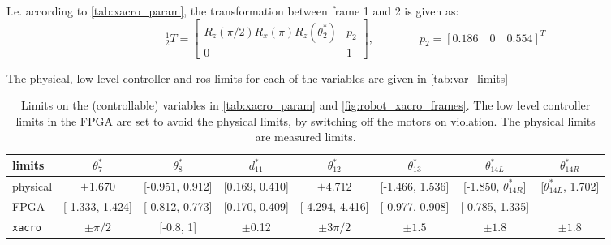I.e. according to \autoref{tab:xacro_param}, the transformation between frame 1 and 2 is given as:
\begin{equation}
^1_2T = 
\begin{bmatrix}
R_z(\pi/2)R_x(\pi)R_z(\theta_2^*) & p_2\\
0 & 1
\end{bmatrix}, \qquad\qquad
p_2 = [0.186 \quad 0 \quad 0.554]^T
\end{equation}

The physical, low level controller and \gls{ros} limits for each of the variables are given in \autoref{tab:var_limits}

\vspace{2mm}
\begin{table}[htbp]
\small
\hspace*{-9mm}
\begin{tabular}{l | ccccccc}\hline
limits & $\theta_7^*$ & $\theta_8^*$ & $d_{11}^*$ & $\theta_{12}^*$ & $\theta_{13}^*$ & $\theta_{14L}^*$ & $\theta_{14R}^*$ \\\hline
physical & $\pm$1.670 & [-0.951, 0.912] & [0.169, 0.410] & $\pm$4.712 & [-1.466, 1.536] & [-1.850, $\theta_{14R}^*$] & [$\theta_{14L}^*$, 1.702] \\
FPGA & [-1.333, 1.424] & [-0.812, 0.773] & [0.170, 0.409] & [-4.294, 4.416] & [-0.977, 0.908] & [-0.785, 1.335] & \\
\texttt{xacro} & $\pm\pi/2$ & [-0.8, 1] & $\pm$0.12 & $\pm3\pi/2$ & $\pm 1.5$ & $\pm 1.8$ & $\pm 1.8$
\end{tabular}
\normalsize
\caption{Limits on the (controllable) variables in \autoref{tab:xacro_param} and \autoref{fig:robot_xacro_frames}. The low level controller limits in the FPGA are set to avoid the physical limits, by switching off the motors on violation. The physical limits are measured limits.}
\label{tab:var_limits}
\end{table}
\vspace{2mm}

